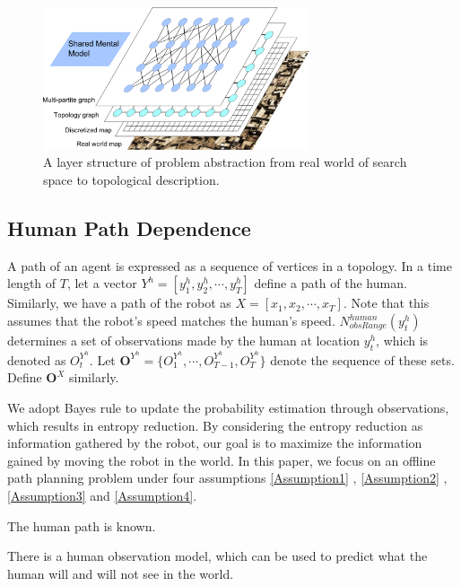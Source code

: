 \documentclass[12pt]{article}
\begin{document}
\begin{figure}[htbp]
\centering
\includegraphics[width=0.7\textwidth]{./images/LayerStructure.pdf}
\caption{A layer structure of problem abstraction from real world of search space to topological description.}
\label{fig:LayerStructure}
\end{figure}

\subsection{Human Path Dependence}
\label{subsec:human_path_dependence}
 
A path of an agent is expressed as a sequence of vertices in a topology. 
In a time length of $ T $, let a vector $ Y^{h} = [y^{h}_{1}, y^{h}_{2} , \cdots , y^{h}_{T}] $ define a path of the human.
Similarly, we have a path of the robot as $ X = [x_{1}, x_{2} , \cdots , x_{T}] $.
Note that this assumes that the robot's speed matches the human's speed.
$ N^{human}_{obsRange}( y^{h}_{t} ) $ determines a set of observations made by the human at location $ y^{h}_{t} $, which is denoted as  $ O^{Y^{h}}_{t} $.
Let $ \mathbf{O}^{Y^{h}} = \{ O^{Y^{h}}_{1}, \cdots , O^{Y^{h}}_{T-1}, O^{Y^{h}}_{T} \} $ denote the sequence of these sets.
Define $ \mathbf{O}^{X} $ similarly.

We adopt Bayes rule to update the probability estimation through observations, which results in entropy reduction.
By considering the entropy reduction as information gathered by the robot, our goal is to maximize the information gained by moving the robot in the world.
In this paper, we focus on an offline path planning problem under four assumptions \ref{Assumption1} , \ref{Assumption2} , \ref{Assumption3} and \ref{Assumption4}.

\begin{Hyp}
\label{Assumption1}
The human path is known.
\end{Hyp}

\begin{Hyp}
\label{Assumption2}
There is a human observation model, which can be used to predict what the human will and will not see in the world.
\end{Hyp}
\end{document}
